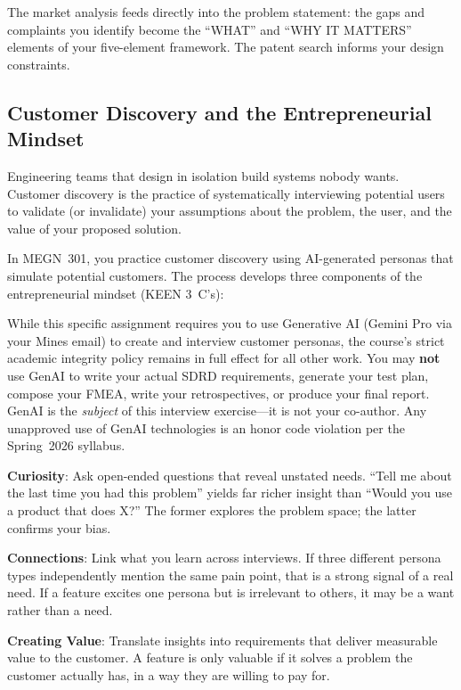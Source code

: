 \documentclass[11pt,letterpaper,twoside,openany]{book}
\begin{document}
The market analysis feeds directly into the problem statement: the gaps and complaints you identify become the ``WHAT'' and ``WHY IT MATTERS'' elements of your five-element framework. The patent search informs your design constraints.

\subsection{Customer Discovery and the Entrepreneurial Mindset}
Engineering teams that design in isolation build systems nobody wants. Customer discovery is the practice of systematically interviewing potential users to validate (or invalidate) your assumptions about the problem, the user, and the value of your proposed solution.

In MEGN~301, you practice customer discovery using AI-generated personas that simulate potential customers. The process develops three components of the entrepreneurial mindset (KEEN 3~C's):

\begin{warningbox}
While this specific assignment requires you to use Generative AI (Gemini Pro via your Mines email) to create and interview customer personas, the course's strict academic integrity policy remains in full effect for all other work. You may \textbf{not} use GenAI to write your actual SDRD requirements, generate your test plan, compose your FMEA, write your retrospectives, or produce your final report. GenAI is the \emph{subject} of this interview exercise---it is not your co-author. Any unapproved use of GenAI technologies is an honor code violation per the Spring~2026 syllabus.
\end{warningbox}

\textbf{Curiosity}: Ask open-ended questions that reveal unstated needs. ``Tell me about the last time you had this problem'' yields far richer insight than ``Would you use a product that does X?'' The former explores the problem space; the latter confirms your bias.

\textbf{Connections}: Link what you learn across interviews. If three different persona types independently mention the same pain point, that is a strong signal of a real need. If a feature excites one persona but is irrelevant to others, it may be a want rather than a need.

\textbf{Creating Value}: Translate insights into requirements that deliver measurable value to the customer. A feature is only valuable if it solves a problem the customer actually has, in a way they are willing to pay for.
\end{document}
